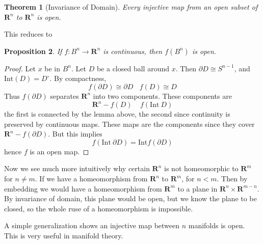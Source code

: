 \documentclass{article}
\theoremstyle{plain}
\newtheorem{theorem}{Theorem}
\newtheorem{prop}[theorem]{Proposition}
\begin{document}
\begin{theorem}[Invariance of Domain]
    Every injective map from an open subset of $\mathbf{R}^n$ to $\mathbf{R}^n$ is open.
\end{theorem}

This reduces to

\begin{prop}
    If $f: B^n \to \mathbf{R}^n$ is continuous, then $f(B^n)$ is open.
\end{prop}
\begin{proof}
    Let $x$ be in $B^n$. Let $D$ be a closed ball around $x$. Then $\partial D \cong S^{n-1}$, and $\text{Int}(D) = D^\circ$. By compactness,
    \[ f(\partial D) \cong \partial D\ \ \ \ f(D) \cong D \]
    Thus $f(\partial D)$ separates $\mathbf{R}^n$ into two components. These components are
    \[ \mathbf{R}^n - f(D)\ \ \ \ \ f(\text{Int}\ D) \]
    the first is connected by the lemma above, the second since continuity is preserved by continuous maps. These maps are the components since they cover $\mathbf{R}^n - f(\partial D)$. But this implies
    \[ f(\text{Int}\ \partial D) = \text{Int} f(\partial D) \]
    hence $f$ is an open map.
\end{proof}

Now we see much more intuitively why certain $\mathbf{R}^n$ is not homeomorphic to $\mathbf{R}^m$ for $n \neq m$. If we have a homeomorphism from $\mathbf{R}^n$ to $\mathbf{R}^m$, for $n < m$. Then by embedding we would have a homeomorphism from $\mathbf{R}^m$ to a plane in $\mathbf{R}^n \times \mathbf{R}^{m-n}$. By invariance of domain, this plane would be open, but we know the plane to be closed, so the whole ruse of a homeomorphism is impossible.

A simple generalization shows an injective map between $n$ manifolds is open. This is very useful in manifold theory.
\end{document}
